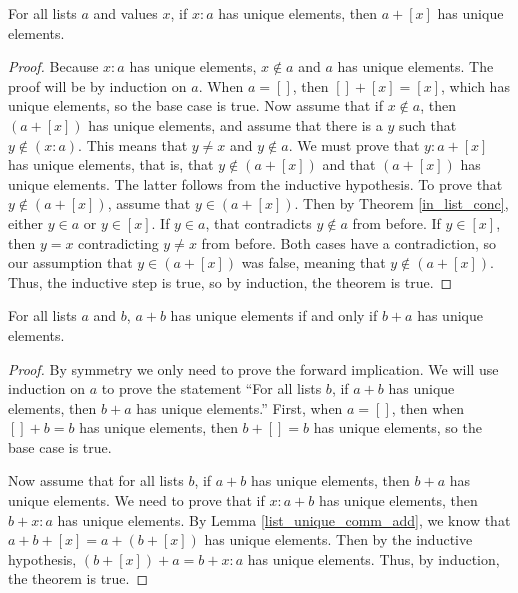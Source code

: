 \documentclass[../../math.tex]{subfiles}
\begin{document}
\begin{lemma} \label{list_unique_comm_add}
    For all lists $a$ and values $x$, if $x : a$ has unique elements, then $a +
    [x]$ has unique elements.
\end{lemma}
\begin{proof}
    Because $x : a$ has unique elements, $x \notin a$ and $a$ has unique
    elements.  The proof will be by induction on $a$.  When $a = []$, then $[] +
    [x] = [x]$, which has unique elements, so the base case is true.  Now assume
    that if $x \notin a$, then $(a + [x])$ has unique elements, and assume that
    there is a $y$ such that $y \notin (x : a)$.  This means that $y \neq x$ and
    $y \notin a$.  We must prove that $y : a + [x]$ has unique elements, that
    is, that $y \notin (a + [x])$ and that $(a + [x])$ has unique elements.  The
    latter follows from the inductive hypothesis.  To prove that $y \notin (a +
    [x])$, assume that $y \in (a + [x])$.  Then by Theorem \ref{in_list_conc},
    either $y \in a$ or $y \in [x]$.  If $y \in a$, that contradicts $y \notin
    a$ from before.  If $y \in [x]$, then $y = x$ contradicting $y \neq x$ from
    before.  Both cases have a contradiction, so our assumption that $y \in (a +
    [x])$ was false, meaning that $y \notin (a + [x])$.  Thus, the inductive
    step is true, so by induction, the theorem is true.
\end{proof}

\begin{theorem} \label{list_unique_comm}
    For all lists $a$ and $b$, $a + b$ has unique elements if and only if $b +
    a$ has unique elements.
\end{theorem}
\begin{proof}
    By symmetry we only need to prove the forward implication.  We will use
    induction on $a$ to prove the statement ``For all lists $b$, if $a + b$ has
    unique elements, then $b + a$ has unique elements.''  First, when $a = []$,
    then when $[] + b = b$ has unique elements, then $b + [] = b$ has unique
    elements, so the base case is true.

    Now assume that for all lists $b$, if $a + b$ has unique elements, then $b +
    a$ has unique elements.  We need to prove that if $x : a + b$ has unique
    elements, then $b + x : a$ has unique elements.  By Lemma
    \ref{list_unique_comm_add}, we know that $a + b + [x] = a + (b + [x])$ has
    unique elements.  Then by the inductive hypothesis, $(b + [x]) + a = b + x :
    a$ has unique elements.  Thus, by induction, the theorem is true.
\end{proof}
\end{document}
